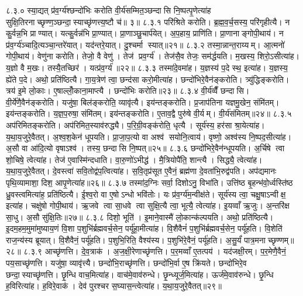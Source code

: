 ८.३.०
स्या॒द्यत् प्र॑व॒र्ग्य॑श्छन्दो॑भिः करोति वी॒र्य॑सम्मित॒ञ्छन्दासि नि॒ष्पत्पृ॒णेत्या॑ह सुक्षि॒तिरनाच्छृण्ण॒ञ्छन्दा॒स्याच्छृ॑णत्त्य॒ष्टौ च॑॥ ३॥
८.३.१
परि॑श्रिते करोति। ब्र॒ह्म॒व॒र्च॒सस्य॒ परि॑गृहीत्यै। न कु॒र्वन्न॒भि प्राण्यात्। यत्कु॒र्वन्न॑भि प्रा॒ण्यात्। प्रा॒णाञ्छु॒चार्प॑येत्। अ॒प॒हाय॒ प्राणि॑ति। प्रा॒णानाङ्गोपी॒थाय॑। न प्र॑व॒र्ग्य॑ञ्चादि॒त्यञ्चा॒न्तरे॑यात्। यद॑न्तरे॒यात्। दु॒श्चर्मा स्यात्॥२१॥
८.३.२
तस्मा॒न्नान्त॒राय्यम्। आ॒त्मनो॑ गोपी॒थाय॑। वेणु॑ना करोति। तेजो॒ वै वेणु॑। तेज॑ प्रव॒र्ग्य॑। तेज॑सै॒व तेजः॒ सम॑र्द्धयति। म॒खस्य॒ शिरो॒ऽसीत्या॑ह। य॒ज्ञो वै म॒खः। तस्यै॒तच्छिर॑। यत्प्र॑व॒र्ग्य॑॥२२॥
८.३.३
तस्मा॑दे॒वमा॑ह। य॒ज्ञस्य॑ प॒दे स्थ॒ इत्या॑ह। य॒ज्ञस्य॒ ह्ये॑ते प॒दे। अथो॒ प्रति॑ष्ठित्यै। गा॒य॒त्रेण॑ त्वा॒ छन्द॑सा करो॒मीत्या॑ह। छन्दो॑भिरे॒वैन॑ङ्करोति। त्र्यु॑द्धिङ्करोति। त्रय॑ इ॒मे लो॒काः। ए॒षाल्लोँ॒काना॒माप्त्यै। छन्दो॑भिः करोति॥२३॥
८.३.४
वी॒र्य॑व्वैँ छन्दासि। वी॒र्ये॑णै॒वैन॑ङ्करोति। यजु॑षा॒ बिल॑ङ्करोति॒ व्यावृ॑त्यै। इय॑न्तङ्करोति। प्र॒जाप॑तिना यज्ञमु॒खेन॒ संमि॑तम्। इय॑न्तङ्करोति। य॒ज्ञ॒प॒रुषा॒ संमि॑तम्। इय॑न्तङ्करोति। ए॒ताव॒द्वै पुरु॑षे वी॒र्यम्। वी॒र्य॑संमितम्॥२४॥
८.३.५
अप॑रिमितङ्करोति। अप॑रिमित॒स्याव॑रुद्ध्यै। प॒रि॒ग्री॒वङ्क॑रोति॒ धृत्यै। सूर्य॑स्य॒ हर॑सा श्रा॒येत्या॑ह। य॒था॒य॒जुरे॒वैतत्। अ॒श्व॒श॒केन॑ धूपयति। प्रा॒जा॒प॒त्यो वा अश्व॑ सयोनि॒त्वाय॑। वृष्णो॒ अश्व॑स्य नि॒ष्पद॒सीत्या॑ह। अ॒सौ वा आ॑दि॒त्यो वृषाऽश्व॑। तस्य॒ छन्दासि नि॒ष्पत्॥२५॥
८.३.६
छन्दो॑भिरे॒वैन॑न्धूपयति। अ॒र्चिषे त्वा शो॒चिषे॒ त्वेत्या॑ह। तेज॑ ए॒वास्मि॑न्दधाति। वा॒रु॒णो॑ऽभीद्ध॑। मै॒त्रियोपै॑ति॒ शान्त्यै। सिद्ध्यै॒ त्वेत्या॑ह। य॒था॒य॒जुरे॒वैतत्। दे॒वस्त्वा॑ सवि॒तोद्व॑प॒त्वित्या॑ह। स॒वि॒तृप्र॑सूत ए॒वैनं॒ ब्रह्म॑णा दे॒वता॑भि॒रुद्व॑पति। अप॑द्यमानः पृथि॒व्यामाशा॒ दिश॒ आपृ॒णेत्या॑ह॥२६॥
८.३.७
तस्मा॑द॒ग्निः सर्वा॒ दिशोऽनु॒ विभा॑ति। उत्ति॑ष्ठ बृ॒हन्भ॑वो॒र्ध्वस्ति॑ष्ठ ध्रु॒वस्त्वमित्या॑ह॒ प्रति॑ष्ठित्यै। ई॒श्व॒रो वा ए॒षोऽन्धो भवि॑तोः। यः प्र॑व॒र्ग्य॑म॒न्वीक्ष॑ते। सूर्य॑स्य त्वा॒ चक्षु॒षाऽन्वीक्ष॒ इत्या॑ह। चक्षु॑षो गोपी॒थाय॑। ऋ॒जवे त्वा सा॒धवे त्वा सुक्षि॒त्यै त्वा॒ भूत्यै॒ त्वेत्या॑ह। इ॒यव्वाँ ऋ॒जुः। अ॒न्तरि॑क्ष सा॒धु। अ॒सौ सु॑क्षि॒तिः॥२७॥
८.३.८
दिशो॒ भूति॑। इ॒माने॒वास्मै॑ लो॒कान्क॑ल्पयति। अथो॒ प्रति॑ष्ठित्यै। इ॒दम॒हम॒मुमा॑मुष्याय॒णं  वि॒शा प॒शुभि॑र्ब्रह्मवर्च॒सेन॒ पर्यू॑हा॒मीत्या॑ह। वि॒शैवैनं॑ प॒शुभि॑र्ब्रह्मवर्च॒सेन॒ पर्यू॑हति। वि॒शेति॑ राज॒न्य॑स्य ब्रूयात्। वि॒शैवैनं॒ पर्यू॑हति। प॒शुभि॒रिति॒ वैश्य॑स्य। प॒शुभि॑रे॒वैनं॒ पर्यू॑हति। अ॒सु॒र्यं॑ पात्र॒मनाच्छृण्णम्॥२८॥
८.३.९
आच्छृ॑णत्ति। दे॒व॒त्राक॑। अ॒ज॒क्षी॒रेणाच्छृ॑णत्ति। प॒र॒मव्वाँ ए॒तत्पय॑। यद॑जक्षी॒रम्। प॒र॒मेणै॒वैनं॒ पय॒साच्छृ॑णत्ति। यजु॑षा॒ व्यावृ॑त्त्यै। छन्दो॑भि॒राच्छृ॑णत्ति। छन्दो॑भि॒र्वा ए॒ष क्रि॑यते। छन्दो॑भिरे॒व छन्दा॒स्याच्छृ॑णत्ति। छृ॒न्धि वाच॒मित्या॑ह। वाच॑मे॒वाव॑रुन्धे। छृ॒न्ध्यूर्ज॒मित्या॑ह। ऊर्ज॑मे॒वाव॑रुन्धे। छृ॒न्धि ह॒विरित्या॑ह। ह॒विरे॒वाक॑। देव॑ पुरश्चर स॒घ्यास॒न्त्वेत्या॑ह। य॒था॒य॒जुरे॒वैतत्॥२९॥
\anuvakamend


